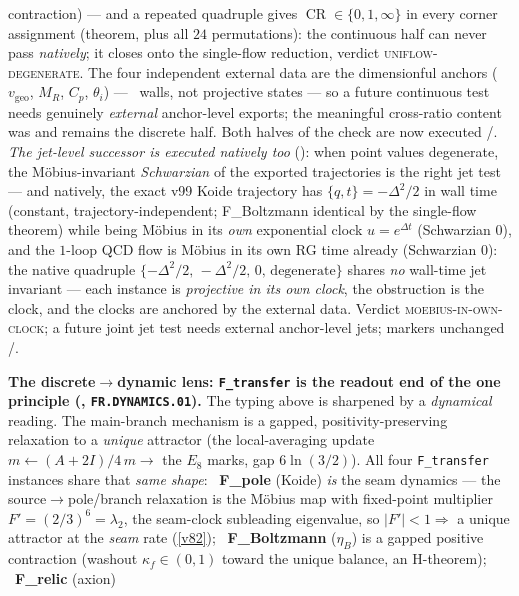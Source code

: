 \documentclass[11pt,a4paper]{article}
\begin{document}
contraction) --- and a repeated quadruple gives $\operatorname{CR}\in\{0,1,\infty\}$ in every
corner assignment (theorem, plus all $24$ permutations): the continuous half can never pass
\emph{natively}; it closes onto the single-flow reduction, verdict \textsc{uniflow-degenerate}.
The four independent external data are the dimensionful anchors ($v_{\mathrm{geo}}$, $M_R$,
$C_p$, $\theta_i$) --- \mO\ walls, not projective states --- so a future continuous test needs
genuinely \emph{external} anchor-level exports; the meaningful cross-ratio content was and
remains the discrete half.  Both halves of the check are now executed \mE/\mC.
\emph{The jet-level successor is executed natively too}
(): when point values degenerate, the M\"obius-invariant
\emph{Schwarzian} of the exported trajectories is the right jet test --- and natively, the
exact v99 Koide trajectory has $\{q,t\}=-\Delta^2/2$ in wall time (constant,
trajectory-independent; F\_Boltzmann identical by the single-flow theorem) while being
M\"obius in its \emph{own} exponential clock $u=e^{\Delta t}$ (Schwarzian $0$), and the
$1$-loop QCD flow is M\"obius in its own RG time already (Schwarzian $0$): the native
quadruple $\{-\Delta^2/2,\,-\Delta^2/2,\,0,\,\text{degenerate}\}$ shares \emph{no}
wall-time jet invariant --- each instance is \emph{projective in its own clock}, the
obstruction is the clock, and the clocks are anchored by the external data.  Verdict
\textsc{moebius-in-own-clock}; a future joint jet test needs external anchor-level jets;
markers unchanged \mE/\mC.
\par\smallskip\noindent\textbf{The discrete$\to$dynamic lens: \texttt{F\_transfer} is the readout end of the one
principle (, \texttt{FR.DYNAMICS.01}).} The typing above is sharpened by a
\emph{dynamical} reading. The main-branch mechanism is a gapped, positivity-preserving relaxation to a
\emph{unique} attractor (the local-averaging update $m\!\leftarrow\!(A{+}2I)/4\,m\to$ the $E_8$ marks, gap
$6\ln(3/2)$). All four \texttt{F\_transfer} instances share that \emph{same shape}: \mE\ \textbf{F\_pole} (Koide)
\emph{is} the seam dynamics --- the source$\to$pole/branch relaxation is the M\"obius map with fixed-point
multiplier $F'{=}(2/3)^6{=}\lambda_2$, the seam-clock subleading eigenvalue, so $|F'|<1\Rightarrow$ a unique
attractor at the \emph{seam} rate (\vref{v82}); \mC\ \textbf{F\_Boltzmann} ($\eta_B$) is a gapped positive
contraction (washout $\kappa_f\in(0,1)$ toward the unique balance, an H-theorem); \mC\ \textbf{F\_relic} (axion)
\end{document}
